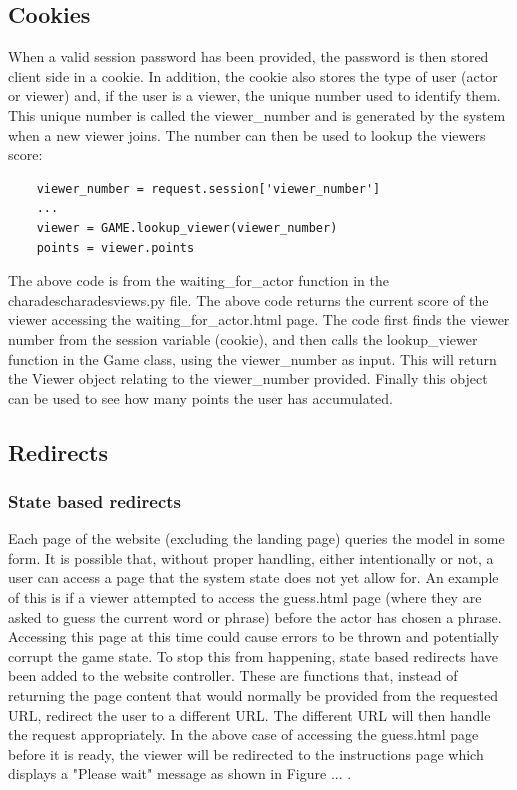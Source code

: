 \subsection{Cookies}
When a valid session password has been provided, the password is then stored client side in a cookie. In addition, the cookie also stores the type of user (actor or viewer) and, if the user is a viewer, the unique number used to identify them. This unique number is called the viewer\_number and is generated by the system when a new viewer joins. The number can then be used to lookup the viewers score:

\begin{verbatim}
	viewer_number = request.session['viewer_number']
	...
	viewer = GAME.lookup_viewer(viewer_number)
	points = viewer.points
\end{verbatim}

The above code is from the waiting\_for\_actor function in the \/charades\/charades\/views.py file. The above code returns the current score of the viewer accessing the waiting\_for\_actor.html page. The code first finds the viewer number from the session variable (cookie), and then calls the lookup\_viewer function in the Game class, using the viewer\_number as input. This will return the Viewer object relating to the viewer\_number provided. Finally this object can be used to see how many points the user has accumulated.

\subsection{Redirects}
\subsubsection{State based redirects}
Each page of the website (excluding the landing page) queries the model in some form. It is possible that, without proper handling, either intentionally or not, a user can access a page that the system state does not yet allow for. An example of this is if a viewer attempted to access the guess.html page (where they are asked to guess the current word or phrase) before the actor has chosen a phrase. Accessing this page at this time could cause errors to be thrown and potentially corrupt the game state. To stop this from happening, state based redirects have been added to the website controller. These are functions that, instead of returning the page content that would normally be provided from the requested URL, redirect the user to a different URL. The different URL will then handle the request appropriately. In the above case of accessing the guess.html page before it is ready, the viewer will be redirected to the instructions page which displays a "Please wait" message as shown in Figure ... .


